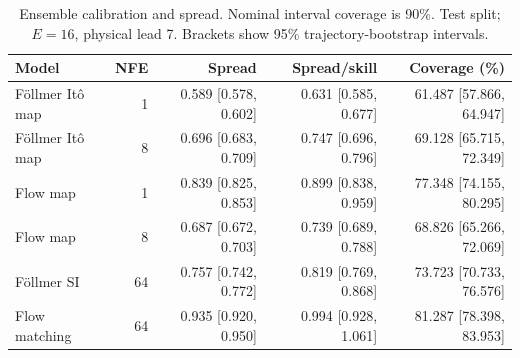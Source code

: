 \begin{table}[t]
\centering
\small
\setlength{\tabcolsep}{3pt}
\caption{Ensemble calibration and spread. Nominal interval coverage is 90\%. Test split; $E=16$, physical lead 7. Brackets show 95\% trajectory-bootstrap intervals.}
\label{tab:map-calibration}
\begin{tabular}{lrrrr}
\toprule
Model & NFE & Spread & Spread/skill & Coverage (\%) \\
\midrule
Föllmer Itô map & 1 & 0.589 [0.578, 0.602] & 0.631 [0.585, 0.677] & 61.487 [57.866, 64.947] \\
Föllmer Itô map & 8 & 0.696 [0.683, 0.709] & 0.747 [0.696, 0.796] & 69.128 [65.715, 72.349] \\
\addlinespace
Flow map & 1 & 0.839 [0.825, 0.853] & 0.899 [0.838, 0.959] & 77.348 [74.155, 80.295] \\
Flow map & 8 & 0.687 [0.672, 0.703] & 0.739 [0.689, 0.788] & 68.826 [65.266, 72.069] \\
\addlinespace
Föllmer SI & 64 & 0.757 [0.742, 0.772] & 0.819 [0.769, 0.868] & 73.723 [70.733, 76.576] \\
\addlinespace
Flow matching & 64 & 0.935 [0.920, 0.950] & 0.994 [0.928, 1.061] & 81.287 [78.398, 83.953] \\
\bottomrule
\end{tabular}
\end{table}
